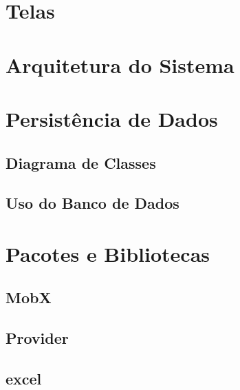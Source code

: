 
\label{Cap:Implementacao}

\section{Telas}
\label{Sec:Telas}

\section{Arquitetura do Sistema}
\label{Sec:ArquiteturaSistema}

\section{Persistência de Dados}
\label{Sec:PersistenciaDados}

\subsection{Diagrama de Classes}
\label{Sec:DiagramaClasses}

\subsection{Uso do Banco de Dados}
\label{Sec:UsoBancoDados}

\section{Pacotes e Bibliotecas}
\label{Sec:PacotesBibliotecas}

\subsection{MobX}
\label{Subsec:MobX}

\subsection{Provider}
\label{Subsec:Provider}

\subsection{excel}
\label{Subsec:excel}



















